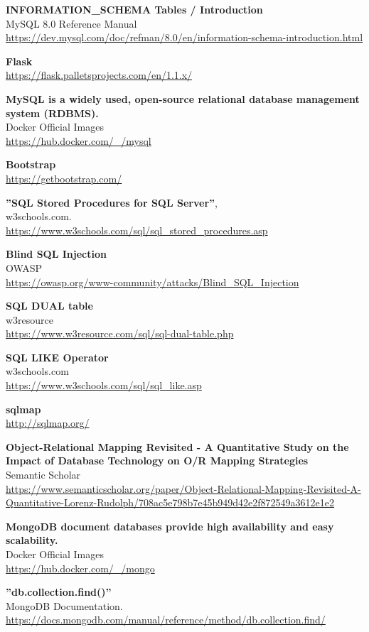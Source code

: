 \documentclass[a4paper,oneside]{article}
\begin{document}
\newpage
\begin{thebibliography}{9}
   
	\textbf{INFORMATION\_SCHEMA Tables / Introduction}\\
	MySQL 8.0 Reference Manual\\
	\url{https://dev.mysql.com/doc/refman/8.0/en/information-schema-introduction.html}

  \textbf{Flask}\\
  \url{https://flask.palletsprojects.com/en/1.1.x/}
 
	\textbf{MySQL is a widely used, open-source relational database management system (RDBMS).}\\
	Docker Official Images\\
	\url{https://hub.docker.com/_/mysql}
	
	\textbf{Bootstrap}\\
	\url{https://getbootstrap.com/}
	
  \textbf{''SQL Stored Procedures for SQL Server''}, \\
  w3schools.com.\\
  \url{https://www.w3schools.com/sql/sql_stored_procedures.asp}
 
	\textbf{Blind SQL Injection}\\
	OWASP\\
	\url{https://owasp.org/www-community/attacks/Blind_SQL_Injection}

	\textbf{SQL DUAL table}\\
	w3resource\\
	\url{https://www.w3resource.com/sql/sql-dual-table.php}

	\textbf{SQL LIKE Operator}\\
	w3schools.com\\
	\url{https://www.w3schools.com/sql/sql_like.asp}

	\textbf{sqlmap}\\
	\url{http://sqlmap.org/}

	\textbf{Object-Relational Mapping Revisited - A Quantitative Study on the Impact of Database Technology on O/R Mapping Strategies}\\
	Semantic Scholar\\
	\url{https://www.semanticscholar.org/paper/Object-Relational-Mapping-Revisited-A-Quantitative-Lorenz-Rudolph/708ac5e798b7e45b949d42e2f872549a3612e1e2}
	
	\textbf{MongoDB document databases provide high availability and easy scalability.}\\
	Docker Official Images\\
	\url{https://hub.docker.com/_/mongo}
  
  \textbf{''db.collection.find()''}\\
  MongoDB Documentation.\\
  \url{https://docs.mongodb.com/manual/reference/method/db.collection.find/}


\end{thebibliography}
\end{document}
